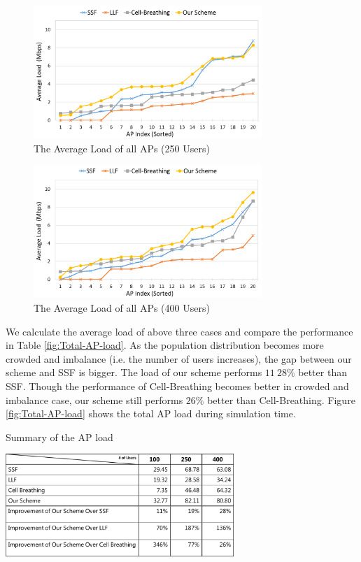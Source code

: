 \begin{figure}[tbp]
\setlength{\abovecaptionskip}{0pt}
\setlength{\belowcaptionskip}{0pt}
\begin{center}
\includegraphics[width=3.4in]{images/Average_AP_load_250.png}
\end{center}
\caption{The Average Load of all APs (250 Users)}
\label{fig:fig4_2b}
\end{figure}

\begin{figure}[tbp]
\setlength{\abovecaptionskip}{0pt}
\setlength{\belowcaptionskip}{0pt}
\begin{center}
\includegraphics[width=3.4in]{images/Average_AP_load_400.png}
\end{center}
\caption{The Average Load of all APs (400 Users)}
\label{fig:fig4_2c}
\end{figure}

We calculate the average load of above three cases and compare the performance in Table \ref{fig:Total-AP-load}. As the population distribution becomes more crowded and imbalance (i.e. the number of users increases), the gap between our scheme and SSF is bigger. The load of our scheme performs $11~28\%$ better than SSF. Though the performance of Cell-Breathing becomes better in crowded and imbalance case, our scheme still performs $26\%$ better than Cell-Breathing. Figure \ref{fig:Total-AP-load} shows the total AP load during simulation time.

\begin{table}[tbp]
\setlength{\belowcaptionskip}{15pt}
\centering
\caption{Summary of the AP load}
\label{tab:Simulation-Setup}
\includegraphics[width=3.4in]{images/table4_3.png}
\end{table}

